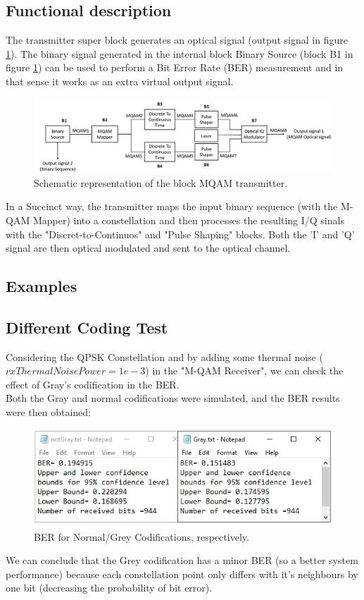 \pagebreak
\subsection*{Functional description}

The transmitter super block generates an optical signal (output signal in figure \ref{MQAM_transmitter_block_diagram}). The binary signal generated in the internal block Binary Source (block B1 in figure \ref{MQAM_transmitter_block_diagram}) can be used to perform a Bit Error Rate (BER) measurement and in that sense it works as an extra  virtual output signal.

\begin{figure}[H]
	\centering
	\includegraphics[width=\textwidth]{./lib/m_qam_transmitter/figures/MQAM_transmitter_block_diagram2}
	\caption{Schematic representation of the block MQAM transmitter.}\label{MQAM_transmitter_block_diagram}
\end{figure}
In a Succinct way, the transmitter maps the input binary sequence (with the M-QAM Mapper) into a constellation and then processes the resulting I/Q sinals with the "Discret-to-Continuos" and "Pulse Shaping" blocks. Both the 'I' and 'Q' signal are then optical modulated and sent to the optical channel.

\subsection*{Examples}
\subsection*{Different Coding Test}
Considering the QPSK Constellation and by adding some thermal noise ($rxThermalNoisePower=1e-3$) in the "M-QAM Receiver", we can check the effect of Gray's codification in the BER.\\
Both the Gray and normal codifications were simulated, and the BER results were then obtained:
\begin{figure}[H]
	\centering
	\includegraphics[scale=0.5]{./lib/m_qam_transmitter/figures/Coding}
	\caption{BER for Normal/Grey Codifications, respectively.}\label{Coding}
\end{figure}
We can conclude that the Grey codification has a minor BER (so a better system performance) because each constellation point only differs with it's neighbours by one bit (decreasing the probability of bit error).
